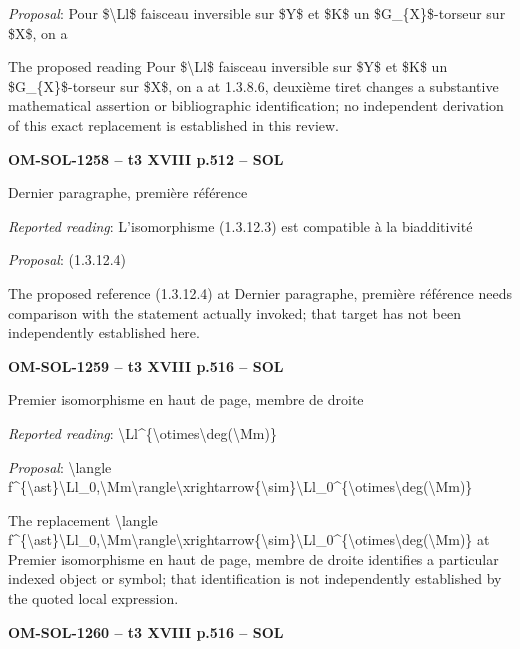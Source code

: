 \emph{Proposal}: Pour \$\textbackslash{}Ll\$ faisceau inversible sur \$Y\$ et \$K\$ un \$G\_\{X\}\$-torseur sur \$X\$, on a\par
The proposed reading Pour \$\textbackslash{}Ll\$ faisceau inversible sur \$Y\$ et \$K\$ un \$G\_\{X\}\$-torseur sur \$X\$, on a at 1.3.8.6, deuxième tiret changes a substantive mathematical assertion or bibliographic identification; no independent derivation of this exact replacement is established in this review.\par
\par\noindent\textbf{OM-SOL-1258 -- t3 XVIII p.512 -- SOL}\par
Dernier paragraphe, première référence\par
\emph{Reported reading}: L'isomorphisme (1.3.12.3) est compatible à la biadditivité\par
\emph{Proposal}: (1.3.12.4)\par
The proposed reference (1.3.12.4) at Dernier paragraphe, première référence needs comparison with the statement actually invoked; that target has not been independently established here.\par
\par\noindent\textbf{OM-SOL-1259 -- t3 XVIII p.516 -- SOL}\par
Premier isomorphisme en haut de page, membre de droite\par
\emph{Reported reading}: \textbackslash{}Ll\textasciicircum{}\{\textbackslash{}otimes\textbackslash{}deg(\textbackslash{}Mm)\}\par
\emph{Proposal}: \textbackslash{}langle f\textasciicircum{}\{\textbackslash{}ast\}\textbackslash{}Ll\_0,\textbackslash{}Mm\textbackslash{}rangle\textbackslash{}xrightarrow\{\textbackslash{}sim\}\textbackslash{}Ll\_0\textasciicircum{}\{\textbackslash{}otimes\textbackslash{}deg(\textbackslash{}Mm)\}\par
The replacement \textbackslash{}langle f\textasciicircum{}\{\textbackslash{}ast\}\textbackslash{}Ll\_0,\textbackslash{}Mm\textbackslash{}rangle\textbackslash{}xrightarrow\{\textbackslash{}sim\}\textbackslash{}Ll\_0\textasciicircum{}\{\textbackslash{}otimes\textbackslash{}deg(\textbackslash{}Mm)\} at Premier isomorphisme en haut de page, membre de droite identifies a particular indexed object or symbol; that identification is not independently established by the quoted local expression.\par
\par\noindent\textbf{OM-SOL-1260 -- t3 XVIII p.516 -- SOL}\par
